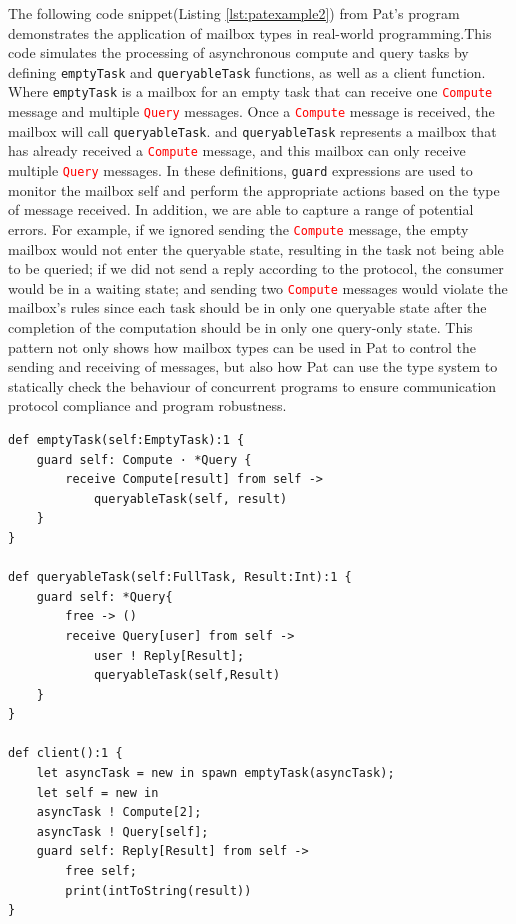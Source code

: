 \documentclass{l4proj}
\begin{document}
The following code snippet(Listing \ref{lst:patexample2}) from Pat's program demonstrates the application of mailbox types in real-world programming.This code simulates the processing of asynchronous compute and query tasks by defining \texttt{emptyTask} and \texttt{queryableTask} functions, as well as a client function. Where \texttt{emptyTask} is a mailbox for an empty task that can receive one \textcolor{red}{\texttt{Compute}} message and multiple \textcolor{red}{\texttt{Query}} messages. Once a \textcolor{red}{\texttt{Compute}} message is received, the mailbox will call \texttt{queryableTask}. and \texttt{queryableTask} represents a mailbox that has already received a \textcolor{red}{\texttt{Compute}} message, and this mailbox can only receive multiple \textcolor{red}{\texttt{Query}} messages. In these definitions, \texttt{guard} expressions are used to monitor the mailbox self and perform the appropriate actions based on the type of message received. In addition, we are able to capture a range of potential errors. For example, if we ignored sending the \textcolor{red}{\texttt{Compute}} message, the empty mailbox would not enter the queryable state, resulting in the task not being able to be queried; if we did not send a reply according to the protocol, the consumer would be in a waiting state; and sending two \textcolor{red}{\texttt{Compute}} messages would violate the mailbox's rules since each task should be in only one queryable state after the completion of the computation should be in only one query-only state. This pattern not only shows how mailbox types can be used in Pat to control the sending and receiving of messages, but also how Pat can use the type system to statically check the behaviour of concurrent programs to ensure communication protocol compliance and program robustness.

\noindent\begin{minipage}{\linewidth}
\begin{lstlisting}[caption={Implementing concurrent program for asynchronous task processing and result querying adapted from \protect\cite{fowler_2023_special}}, label={lst:patexample2}]
def emptyTask(self:EmptyTask):1 {
    guard self: Compute · *Query {
        receive Compute[result] from self -> 
            queryableTask(self, result)
    }
}

def queryableTask(self:FullTask, Result:Int):1 {
    guard self: *Query{
        free -> ()
        receive Query[user] from self ->
            user ! Reply[Result];
            queryableTask(self,Result)
    }
}

def client():1 {
    let asyncTask = new in spawn emptyTask(asyncTask);
    let self = new in 
    asyncTask ! Compute[2];
    asyncTask ! Query[self];
    guard self: Reply[Result] from self ->
        free self;
        print(intToString(result))
}

\end{lstlisting}
\end{minipage}
\end{document}
